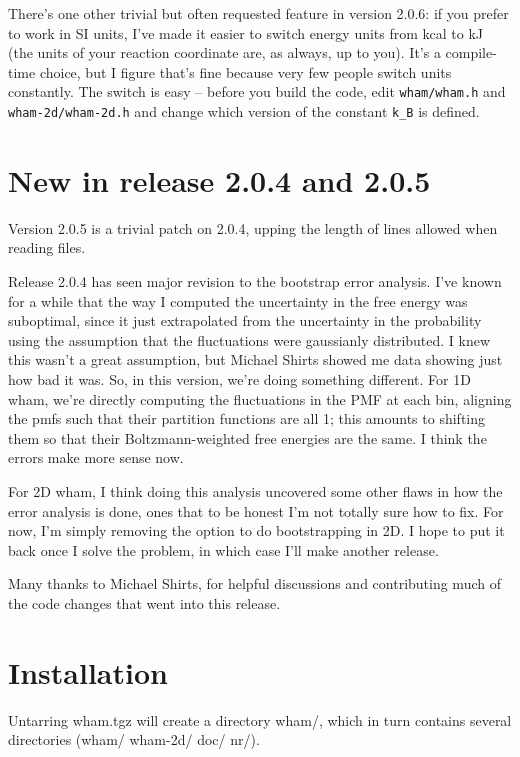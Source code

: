 \documentclass[12pt]{article}
\begin{document}
There's one other trivial but often requested feature in version 2.0.6: if
you prefer to work in SI units, I've made it easier to switch energy units 
from kcal to kJ (the units of your reaction coordinate are, as always, up to
you).  It's a compile-time choice, but I figure that's fine because very few
people switch units constantly.  The switch is easy -- before you build the
code, edit {\tt wham/wham.h} and {\tt wham-2d/wham-2d.h} and change which
version of the constant {\tt k\_B} is defined.

\section{New in release 2.0.4 and 2.0.5}

Version 2.0.5 is a trivial patch on 2.0.4, upping the length of lines allowed
when reading files.

Release 2.0.4 has seen major revision to the bootstrap error analysis.  
I've known for a while that the way I computed the uncertainty in the free
energy was suboptimal, since it just extrapolated from the uncertainty in the
probability using the assumption that the fluctuations were gaussianly
distributed.  I knew this wasn't a great assumption, but Michael Shirts
showed me data showing just how bad it was.  So, in this version, we're doing
something different.  For 1D wham, we're directly computing the fluctuations
in the PMF at each bin, aligning the pmfs such that their partition functions
are all 1; this amounts to shifting them so that their Boltzmann-weighted
free energies are the same.  I think the errors make more sense now.

For 2D wham, I think doing this analysis uncovered some other flaws in how the
error analysis is done, ones that to be honest I'm not totally sure how to
fix.  For now, I'm simply removing the option to do bootstrapping in 2D.  I
hope to put it back once I solve the problem, in which case I'll make another
release.

Many thanks to Michael Shirts, for helpful discussions and contributing much
of the code changes that went into this release.

\section{Installation}

Untarring wham.tgz will create a directory wham/, which in turn contains
several directories (wham/ wham-2d/ doc/ nr/).   
\end{document}
